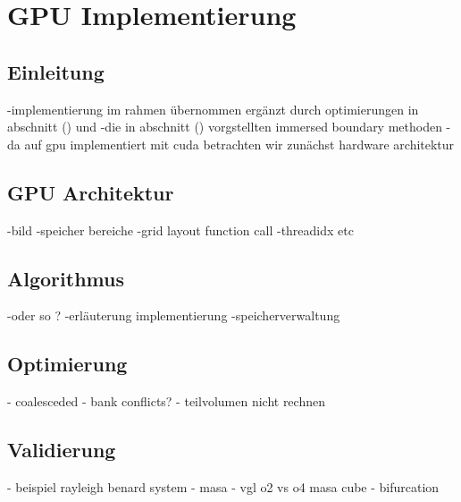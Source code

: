 \chapter{GPU Implementierung}
\section{Einleitung}
-implementierung  im rahmen übernommen  ergänzt durch optimierungen in abschnitt () und
-die in abschnitt () vorgstellten immersed boundary methoden
- da auf gpu implementiert mit cuda betrachten wir zunächst hardware architektur


\section{GPU Architektur}
-bild
-speicher bereiche
-grid layout function call
-threadidx etc

\section{Algorithmus}
-oder so ?
-erläuterung  implementierung
-speicherverwaltung

\section{Optimierung}
- coalesceded
- bank conflicts?
- teilvolumen nicht rechnen

\section{Validierung}
- beispiel rayleigh benard system
- masa
- vgl o2 vs o4 masa cube
- bifurcation


\newpage

